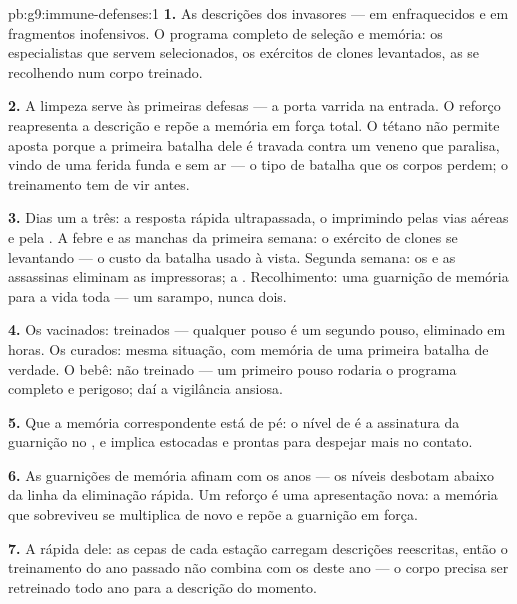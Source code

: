 \begin{solution}{pb:g9:immune-defenses:1}
\textbf{1.} As descrições dos invasores ---  em
 enfraquecidos e em fragmentos inofensivos. O
programa completo de seleção e memória: os especialistas que
servem selecionados, os exércitos de clones levantados, as
 se recolhendo num corpo treinado.

\textbf{2.} A limpeza serve às primeiras defesas --- a porta
varrida na entrada. O reforço reapresenta a descrição e repõe
a memória em força total. O tétano não permite aposta porque
a primeira batalha dele é travada contra um veneno que
paralisa, vindo de uma ferida funda e sem ar --- o tipo de
batalha que os corpos perdem; o treinamento tem de vir antes.

\textbf{3.} Dias um a três: a resposta rápida ultrapassada, o
 imprimindo pelas vias aéreas e pela . A febre e as
manchas da primeira semana: o exército de clones se
levantando --- o custo da batalha usado à vista. Segunda
semana: os  e as assassinas eliminam as
impressoras; a . Recolhimento: uma guarnição de
memória para a vida toda --- um sarampo, nunca dois.

\textbf{4.} Os vacinados: treinados --- qualquer pouso é um
segundo pouso, eliminado em horas. Os curados: mesma
situação, com memória de uma primeira batalha de verdade. O
bebê: não treinado --- um primeiro pouso rodaria o programa
completo e perigoso; daí a vigilância ansiosa.

\textbf{5.} Que a memória correspondente está de pé: o nível
de  é a assinatura da guarnição no , e
implica  estocadas e prontas para despejar
mais no contato.

\textbf{6.} As guarnições de memória afinam com os anos ---
os níveis desbotam abaixo da linha da eliminação rápida. Um
reforço é uma apresentação nova: a memória que sobreviveu se
multiplica de novo e repõe a guarnição em força.

\textbf{7.} A  rápida dele: as cepas de cada estação
carregam descrições reescritas, então o treinamento do ano
passado não combina com os  deste ano --- o corpo
precisa ser retreinado todo ano para a descrição do momento.


\end{solution}
